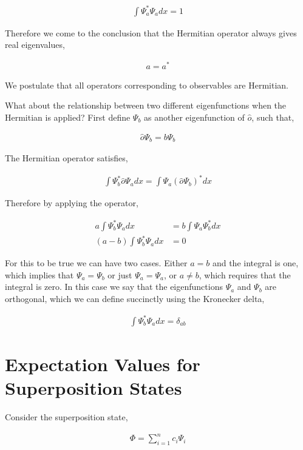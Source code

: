 \documentclass[11pt]{amsart}
\begin{document}
\begin{align*}
  \int\Psi_a^*\Psi_a dx = 1
\end{align*}

Therefore we come to the conclusion that the Hermitian operator always gives real eigenvalues,

\begin{align*}
  a = a^*
\end{align*}

We postulate that all operators corresponding to observables are Hermitian.

What about the relationship between two different eigenfunctions when the Hermitian is applied? First define $\Psi_b$ as another eigenfunction of $\hat{o}$, such that,

\begin{align*}
  \hat{o}\Psi_b = b\Psi_b
\end{align*}

The Hermitian operator satisfies,

\begin{align*}
  \int\Psi_b^*\hat{o}\Psi_a dx = \int\Psi_a(\hat{o}\Psi_b)^* dx
\end{align*}

Therefore by applying the operator,

\begin{align*}
  a\int\Psi_b^*\Psi_a dx &= b\int\Psi_a\Psi_b^* dx \\
  \left(a - b\right) \int\Psi_b^*\Psi_a dx &= 0
\end{align*}

For this to be true we can have two cases. Either $a = b$ and the integral is one, which implies that $\Psi_a = \Psi_b$ or just $\Psi_a = \Psi_a$, or $a \neq b$, which requires that the integral is zero. In this case we say that the eigenfunctions $\Psi_a$ and $\Psi_b$ are orthogonal, which we can define succinctly using the Kronecker delta,

\begin{align*}
  \int\Psi_b^*\Psi_a dx = \delta_{ab}
\end{align*}

\section{Expectation Values for Superposition States}

Consider the superposition state,

\begin{align*}
  \Phi = \sum\limits_{i=1}^n c_i \Psi_i
\end{align*}
\end{document}
